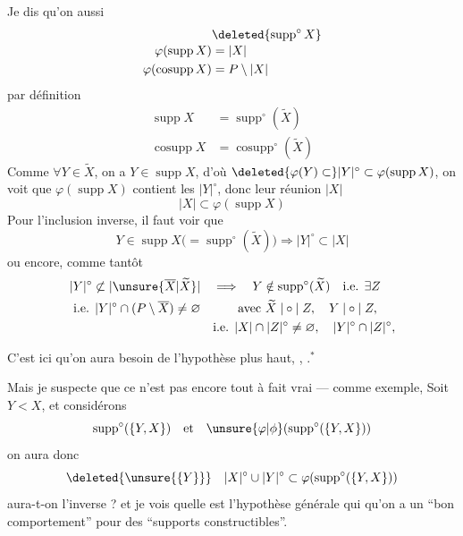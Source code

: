  Je dis qu'on  aussi
\[
\begin{aligned}
&\deleted{\operatorname{supp}^{\circ}X}\\[-2pt]
\varphi(\operatorname{supp}X)&=|X|\\
\varphi(\operatorname{cosupp}X)&=P\setminus|X|
\end{aligned}
\]
  par définition
\[
\begin{aligned}
\operatorname{supp}X&=\operatorname{supp}^{\circ}(\widetilde X)\\
\operatorname{cosupp}X&=\operatorname{cosupp}^{\circ}(\widetilde X)
\end{aligned}
\]
Comme  $\forall Y\in\widetilde X$, on a $Y\in\operatorname{supp}X$, d'où $\deleted{\varphi(Y)\subset}|Y|^{\circ}\subset\varphi(\operatorname{supp}X)$, on voit que $\varphi(\operatorname{supp}X)$ contient les $|Y|^{\circ}$, donc leur réunion $|X|$
\[
|X|\subset\varphi(\operatorname{supp}X)
\]
Pour l'inclusion inverse, il faut voir que
\[
Y\in\operatorname{supp}X\bigl(=\operatorname{supp}^{\circ}(\widetilde X)\bigr)\Longrightarrow|Y|^{\circ}\subset|X|
\]
ou encore, comme tantôt
\[
\begin{aligned}
|Y|^{\circ}\not\subset|\unsure{\overline X|\widetilde X}|\quad&\Longrightarrow\quad Y\notin\operatorname{supp}^{\circ}(\widetilde X)\quad\text{i.e. }\exists Z\\
\text{i.e. }|Y|^{\circ}\cap(P\setminus\overline X)\neq\varnothing\quad&\qquad\text{avec }\widetilde X\mathrel{|\circ|}Z,\quad Y\mathrel{|\circ|}Z,\\
&\text{i.e. }|X|\cap|Z|^{\circ}\neq\varnothing,\quad |Y|^{\circ}\cap|Z|^{\circ},
\end{aligned}
\]
\clearpage
{}

C'est  ici qu'on aura besoin de l'hypothèse plus haut,  , .$^{*}$

Mais je suspecte que ce n'est pas encore tout à fait vrai --- comme exemple, Soit $Y<X$, et considérons
\[
\operatorname{supp}^{\circ}(\{Y,X\})\quad\text{et}\quad\unsure{\varphi|\phi}(\operatorname{supp}^{\circ}(\{Y,X\}))
\]
on aura donc
\[
\deleted{\unsure{\{Y\}}}\quad |X|^{\circ}\cup|Y|^{\circ}\subset\varphi(\operatorname{supp}^{\circ}(\{Y,X\}))
\]
aura-t-on l'inverse ?   et je vois  quelle est l'hypothèse générale qui   qu'on a un ``bon comportement'' pour des ``supports  constructibles''.

